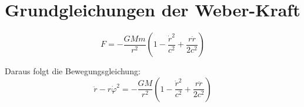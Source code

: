 \section{Grundgleichungen der Weber-Kraft}
\[ F = -\frac{GMm}{r^2}\left(1 - \frac{\dot{r}^2}{c^2} + \frac{r\ddot{r}}{2c^2}\right) \]

Daraus folgt die Bewegungsgleichung:
\[ \ddot{r} - r\dot{\varphi}^2 = -\frac{GM}{r^2}\left(1 - \frac{\dot{r}^2}{c^2} + \frac{r\ddot{r}}{2c^2}\right) \]
